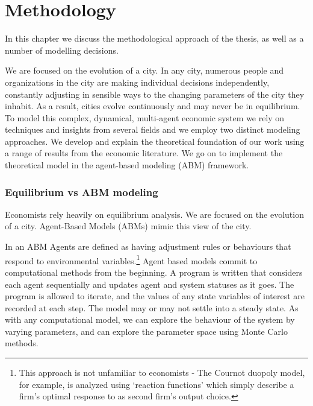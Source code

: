 \chapter{Methodology} \label{chapter-methodology}

In this chapter we discuss the methodological approach of the thesis, as well as a number of modelling decisions. 


We are focused on the evolution of a city. In any city, numerous people and organizations in the city are making individual decisions independently, constantly adjusting in sensible ways to the changing parameters of the city they inhabit. As a result, cities evolve continuously and may never be in equilibrium.  To model this complex, dynamical, multi-agent economic system we  rely on techniques and insights from several fields and we  employ two distinct modeling approaches. We develop and explain the theoretical foundation of our work using a range of results from the economic  literature. We go on to implement the theoretical model in the agent-based modeling (ABM) framework. 

\subsection{Equilibrium vs ABM modeling}
Economists rely heavily on equilibrium analysis. 
We are focused on the evolution of a city.  %
Agent-Based Models (ABMs) mimic this view of the city.   

In an ABM Agents are defined as having adjustment rules or behaviours that respond to environmental variables.\footnote{This approach is not unfamiliar to economists - The Cournot duopoly model, for example, is analyzed using `reaction functions' which simply describe a firm's optimal response to as second firm's output choice.} Agent based models commit to computational methods from the beginning. A program is written that considers each agent sequentially and updates agent and system statuses as it goes. The program is allowed to iterate, and the values of any state variables of interest are recorded at each step. The model may or may not settle into a steady state. As with any computational model, we can explore the behaviour of the system by varying parameters, and can explore the parameter space using Monte Carlo methods.

